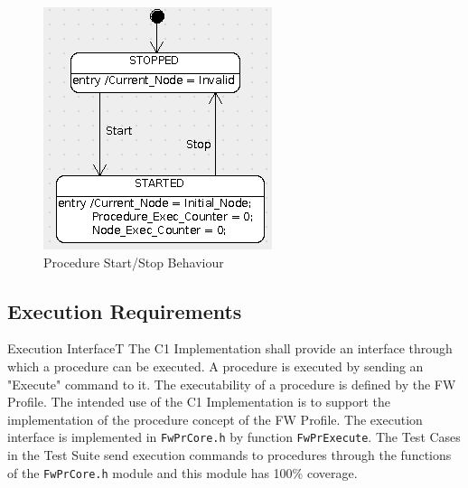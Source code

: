 \documentclass[a4paper,10pt]{article}
\newenvironment{fw_req_note}[7]
{\addtocounter{subsubsection}{1}
	\hspace{0.2cm}\textbf{FW-\arabic{section}.\arabic{subsection}.\arabic{subsubsection}/#2
	\hspace{0.8cm} #1}
	\vspace{-10pt}
\begin{longtable}{p{2.7cm}P{8.5cm}}
\hline
\textsc{Requirement} & #3 \\
\textsc{Note} & #4 \\
\textsc{Justification} & #5 \\
\textsc{Implementation} & #6  \\ 
\textsc{Verification} & #7  \\
\hline
}
{\end{longtable}}
\begin{document}
\begin{figure}[h]
 \centering
 \includegraphics[scale=0.5,keepaspectratio=true]{../images/PR_StartStop.png}
 \caption{Procedure Start/Stop Behaviour}
 \label{fig:PrStartStop}
\end{figure}

\subsection{Execution Requirements}\label{req:execInterface}

\begin{fw_req_note}{Execution Interface}{T}
{The C1 Implementation shall provide an interface through which a procedure 
can be executed.}
{A procedure is executed by sending an "Execute" command to it.}
{The executability of a procedure is defined by the FW Profile. 
The intended use of the C1 Implementation is to support the implementation of the procedure 
concept of the FW Profile.}
{The execution interface is implemented in \texttt{FwPrCore.h} by 
function \texttt{FwPrExecute}.} 
{The Test Cases in the Test Suite send execution commands to procedures 
through the functions of the \texttt{FwPrCore.h} module and this module has 100\% coverage.}
\end{fw_req_note}
\end{document}
